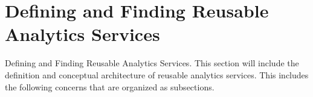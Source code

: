 
\section{Defining and Finding Reusable Analytics Services}
\label{sec:defining}

Defining and Finding Reusable Analytics Services. This section will include
the definition and conceptual architecture of reusable analytics services. This includes the
following concerns that are organized as subsections.
